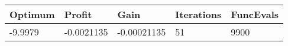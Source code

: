 \begin{tabular}{lllll}
Optimum & Profit & Gain & Iterations & FuncEvals \\ 
\hline 
-9.9979 & -0.0021135 & -0.00021135 & 51 & 9900 \\ 
\hline 
\end{tabular}